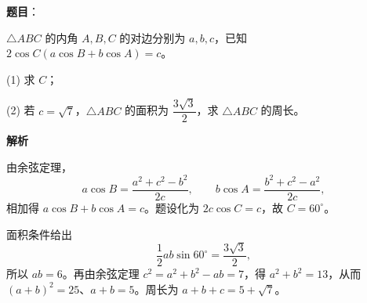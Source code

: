\begin{answer}

\textbf{题目}：

$\triangle ABC$ 的内角 $A,B,C$ 的对边分别为 $a,b,c$，已知 $2\cos C(a\cos B+b\cos A)=c$。

   (1) 求 $C$；

   (2) 若 $c=\sqrt7$，$\triangle ABC$ 的面积为 $\dfrac{3\sqrt3}{2}$，求 $\triangle ABC$ 的周长。

\textbf{解析}


由余弦定理，
\nopagebreak[4]
\[
a\cos B=\frac{a^2+c^2-b^2}{2c},\qquad
b\cos A=\frac{b^2+c^2-a^2}{2c},
\]
相加得 \(a\cos B+b\cos A=c\)。题设化为 \(2c\cos C=c\)，故 \(C=60^\circ\)。


面积条件给出
\nopagebreak[4]
\[
\frac12ab\sin60^\circ=\frac{3\sqrt3}{2},
\]
所以 \(ab=6\)。再由余弦定理 \(c^2=a^2+b^2-ab=7\)，得 \(a^2+b^2=13\)，从而 \((a+b)^2=25\)、\(a+b=5\)。周长为 \(a+b+c=5+\sqrt7\)。



\end{answer}
